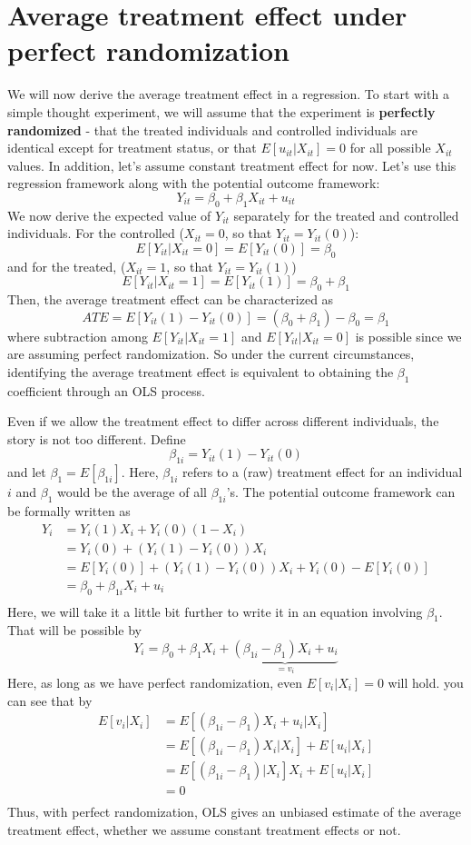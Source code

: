 \section{Average treatment effect under perfect randomization}
We will now derive the average treatment effect in a regression. To start with a simple thought experiment, we will assume that the experiment is \textbf{perfectly randomized} - that the treated individuals and controlled individuals are identical except for treatment status, or that $E[u_{it}|X_{it}]=0$ for all possible $X_{it}$ values. In addition, let's assume constant treatment effect for now. Let's use this regression framework along with the potential outcome framework:
\[
Y_{it} = \beta_0 + \beta_1 X_{it}+u_{it}
\] 
We now derive the expected value of $Y_{it}$ separately for the treated and controlled individuals. For the controlled ($X_{it}=0$, so that $Y_{it}=Y_{it}(0)$):
\[
E[Y_{it}|X_{it}=0]=E[Y_{it}(0)]=\beta_0
\]
and for the treated, ($X_{it}=1$, so that $Y_{it}=Y_{it}(1)$)
\[
E[Y_{it}|X_{it}=1]=E[Y_{it}(1)]=\beta_0+\beta_1
\]
Then, the average treatment effect can be characterized as
\[
ATE = E[Y_{it}(1)-Y_{it}(0)]=(\beta_0+\beta_1)-\beta_0=\beta_1
\]
where subtraction among $E[Y_{it}|X_{it}=1]$ and $E[Y_{it}|X_{it}=0]$ is possible since we are assuming perfect randomization. So under the current circumstances, identifying the average treatment effect is equivalent to obtaining the $\beta_1$ coefficient through an OLS process.
\par\medskip
Even if we allow the treatment effect to differ across different individuals, the story is not too different. Define
\[
\beta_{1i}= Y_{it}(1)-Y_{it}(0)
\]
and let $\beta_1=E[\beta_{1i}]$. Here, $\beta_{1i}$ refers to a (raw) treatment effect for an individual $i$ and $\beta_1$ would be the average of all $\beta_{1i}$'s. The potential outcome framework can be formally written as
\[
\begin{aligned}
Y_i & = Y_i(1)X_i+Y_i(0)(1-X_i)\\
&=Y_i(0)+(Y_i(1)-Y_i(0))X_i \\
&=E[Y_i(0)]+(Y_i(1)-Y_i(0))X_i+Y_i(0)-E[Y_i(0)]\\
&=\beta_0+\beta_{1i}X_i+u_i   \\
\end{aligned} 
\]
Here, we will take it a little bit further to write it in an equation involving $\beta_1$. That will be possible by
\[
Y_i = \beta_0 + \beta_1X_i+\underbrace{(\beta_{1i}-\beta_1)X_i+u_i}_{=v_i}
\]
Here, as long as we have perfect randomization, even $E[v_i|X_i]=0$ will hold. you can see that by
\[
\begin{aligned}
E[v_i|X_i]&=E[(\beta_{1i}-\beta_1)X_i+u_i|X_i]\\
&=E[(\beta_{1i}-\beta_1)X_i|X_i]+E[u_i|X_i]\\
&=E[(\beta_{1i}-\beta_1)|X_i]X_i+E[u_i|X_i]\\
&=0\\
\end{aligned}
\]
Thus, with perfect randomization, OLS gives an unbiased estimate of the average treatment effect, whether we assume constant treatment effects or not. 
